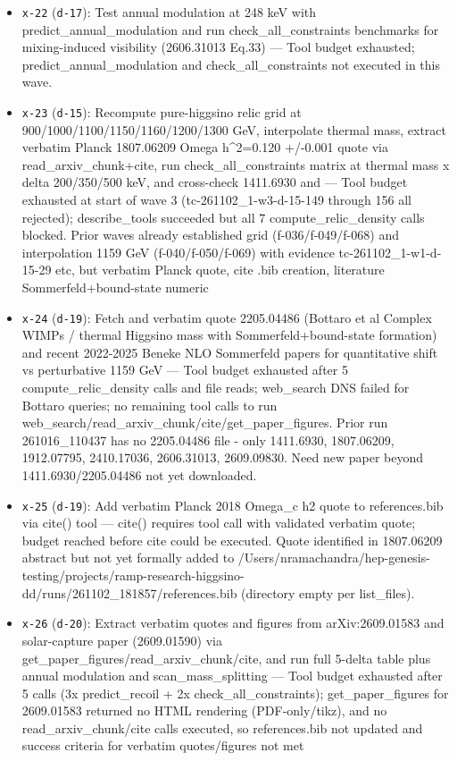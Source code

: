 \documentclass[11pt,a4paper]{article}
\begin{document}
\begin{itemize}
  \item \texttt{x-22} (\texttt{d-17}): Test annual modulation at 248 keV with predict\_annual\_modulation and run check\_all\_constraints benchmarks for mixing-induced visibility (2606.31013 Eq.33) --- Tool budget exhausted; predict\_annual\_modulation and check\_all\_constraints not executed in this wave.
  \item \texttt{x-23} (\texttt{d-15}): Recompute pure-higgsino relic grid at 900/1000/1100/1150/1160/1200/1300 GeV, interpolate thermal mass, extract verbatim Planck 1807.06209 Omega h\textasciicircum{}2=0.120 +/-0.001 quote via read\_arxiv\_chunk+cite, run check\_all\_constraints matrix at thermal mass x delta 200/350/500 keV, and cross-check 1411.6930 and  --- Tool budget exhausted at start of wave 3 (tc-261102\_1-w3-d-15-149 through 156 all rejected); describe\_tools succeeded but all 7 compute\_relic\_density calls blocked. Prior waves already established grid (f-036/f-049/f-068) and interpolation 1159 GeV (f-040/f-050/f-069) with evidence tc-261102\_1-w1-d-15-29 etc, but verbatim Planck quote, cite .bib creation, literature Sommerfeld+bound-state numeric 
  \item \texttt{x-24} (\texttt{d-19}): Fetch and verbatim quote 2205.04486 (Bottaro et al Complex WIMPs / thermal Higgsino mass with Sommerfeld+bound-state formation) and recent 2022-2025 Beneke NLO Sommerfeld papers for quantitative shift vs perturbative 1159 GeV --- Tool budget exhausted after 5 compute\_relic\_density calls and file reads; web\_search DNS failed for Bottaro queries; no remaining tool calls to run web\_search/read\_arxiv\_chunk/cite/get\_paper\_figures. Prior run 261016\_110437 has no 2205.04486 file - only 1411.6930, 1807.06209, 1912.07795, 2410.17036, 2606.31013, 2609.09830. Need new paper beyond 1411.6930/2205.04486 not yet downloaded.
  \item \texttt{x-25} (\texttt{d-19}): Add verbatim Planck 2018 Omega\_c h2 quote to references.bib via cite() tool --- cite() requires tool call with validated verbatim quote; budget reached before cite could be executed. Quote identified in 1807.06209 abstract but not yet formally added to /Users/nramachandra/hep-genesis-testing/projects/ramp-research-higgsino-dd/runs/261102\_181857/references.bib (directory empty per list\_files).
  \item \texttt{x-26} (\texttt{d-20}): Extract verbatim quotes and figures from arXiv:2609.01583 and solar-capture paper (2609.01590) via get\_paper\_figures/read\_arxiv\_chunk/cite, and run full 5-delta table plus annual modulation and scan\_mass\_splitting --- Tool budget exhausted after 5 calls (3x predict\_recoil + 2x check\_all\_constraints); get\_paper\_figures for 2609.01583 returned no HTML rendering (PDF-only/tikz), and no read\_arxiv\_chunk/cite calls executed, so references.bib not updated and success criteria for verbatim quotes/figures not met

\end{itemize}
\end{document}
